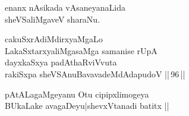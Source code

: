 \begin{entry}
\begin{shl}
enanx nAsikada vAsaneyanaLida\\
sheVSaliMgaveV sharaNu.
\end{shl}
\end{entry}

\begin{entry}
\end{entry}

\begin{entry}
\gl{}
\begin{shl}
cakuSxrAdiMdirxyaMgaLo\\
LakaSxtarxyaliMgasaMga samanise rUpA\\
dayxkaSxya padAthaRviVvuta\\
rakiSxpa sheVSAnuBavavadeMdAdapudoV ||\,96\,||
\end{shl}
\end{entry}

\begin{entry}
\begin{shl}
pAtALagaMgeyanu Otu cipipxlimogeya\\
BUkaLake avagaDeyu|shevxVtanadi batitx ||
\end{shl}
\end{entry}

\begin{entry}
\mng{}
\end{entry}

